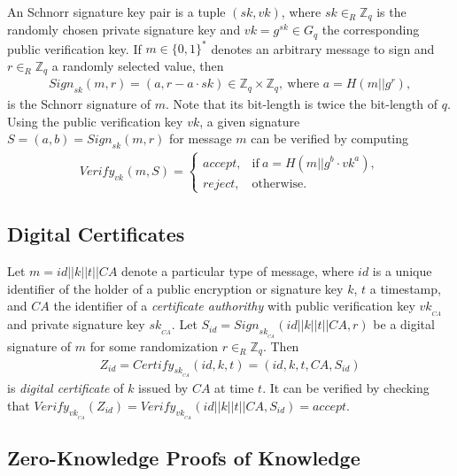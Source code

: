 \documentclass[bibtotoc,halfparskip,oneside]{scrreprt}
\newcommand{\sk}[1]{\mathit{sk}_{#1}\xspace}
\newcommand{\vk}[1]{\mathit{vk}_{#1}\xspace}
\newcommand{\SK}[1]{\sk{_#1}\xspace}
\newcommand{\VK}[1]{\vk{_#1}\xspace}
\newcommand{\CA}{\ensuremath{\mathit{CA}}\xspace}
\begin{document}
An Schnorr signature key pair is a tuple $(sk,vk)$, where $sk\in_R\mathbb{Z}_q$ is the randomly chosen private signature key and $vk=g^{sk}\in G_q$ the corresponding public verification key. If $m\in\{0,1\}^*$ denotes an arbitrary message to sign and $r\in_R\mathbb{Z}_q$ a randomly selected value, then \begin{align}
	\mathit{Sign}_{sk}(m,r)=(a,r-a\cdot sk)\in \mathbb{Z}_q\times \mathbb{Z}_q,~\text{where $a=H(m||g^r)$},
\end{align}
is the Schnorr signature of $m$. Note that its bit-length is twice the bit-length of $q$. Using the public verification key $vk$, a given signature $S=(a,b)=\mathit{Sign}_{sk}(m,r)$ for message $m$ can be verified by computing
\begin{align}
	\mathit{Verify}_{\vk{}}(m,S)=\begin{cases}
	\mathit{accept}, & \text{if}~ a = H(m||g^b\cdot vk^a),\\
	\mathit{reject}, & \text{otherwise}.
	\end{cases}
\end{align}

\subsection{Digital Certificates} 

Let $m=id||k||t||\CA$ denote a particular type of message, where $id$ is a unique identifier of the holder of a public encryption or signature key $k$, $t$ a timestamp, and $\CA$ the identifier of a \emph{certificate authorithy} with public verification key $\VK{\CA}$ and private signature key $\SK{\CA}$. Let $S_{id}=\mathit{Sign}_{\SK{\CA}}(id||k||t||\CA,r)$ be a digital signature of $m$ for some randomization $r\in_R\mathbb{Z}_q$. Then 
\begin{align}
	Z_{id}=\mathit{Certify}_{\SK{\CA}}(id,k,t)=(id,k,t,\CA,S_{id})
\end{align}
is \emph{digital certificate} of $k$ issued by $\CA$ at time $t$. It can be verified by checking that $\mathit{Verify}_{\VK{\CA}}(Z_{id})=\mathit{Verify}_{\VK{\CA}}(id||k||t||\CA,S_{id})=\mathit{accept}$.

\subsection{Zero-Knowledge Proofs of Knowledge}\label{zkp}
\end{document}
